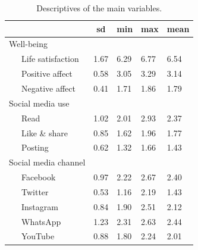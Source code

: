 \documentclass[
  man,mask]{apa7}
\begin{document}
\newpage

\begin{table}[tbp]

\begin{center}
\begin{threeparttable}

\caption{\label{tab:tab-descriptives}Descriptives of the main variables.}

\begin{tabular}{lllll}
\toprule
 & \multicolumn{1}{c}{sd} & \multicolumn{1}{c}{min} & \multicolumn{1}{c}{max} & \multicolumn{1}{c}{mean}\\
\midrule
Well-being &  &  &  & \\
\ \ \ Life satisfaction & 1.67 & 6.29 & 6.77 & 6.54\\
\ \ \ Positive affect & 0.58 & 3.05 & 3.29 & 3.14\\
\ \ \ Negative affect & 0.41 & 1.71 & 1.86 & 1.79\\
Social media use &  &  &  & \\
\ \ \ Read & 1.02 & 2.01 & 2.93 & 2.37\\
\ \ \ Like \& share & 0.85 & 1.62 & 1.96 & 1.77\\
\ \ \ Posting & 0.62 & 1.32 & 1.66 & 1.43\\
Social media channel &  &  &  & \\
\ \ \ Facebook & 0.97 & 2.22 & 2.67 & 2.40\\
\ \ \ Twitter & 0.53 & 1.16 & 2.19 & 1.43\\
\ \ \ Instagram & 0.84 & 1.90 & 2.51 & 2.12\\
\ \ \ WhatsApp & 1.23 & 2.31 & 2.63 & 2.44\\
\ \ \ YouTube & 0.88 & 1.80 & 2.24 & 2.01\\
\bottomrule
\end{tabular}

\end{threeparttable}
\end{center}

\end{table}

\newpage
\end{document}
